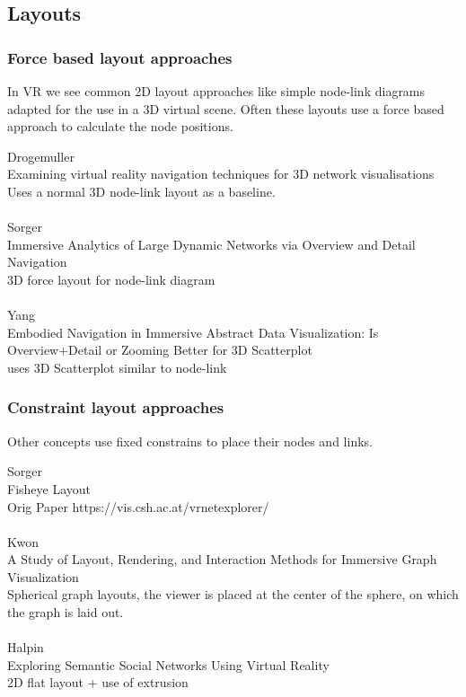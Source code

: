 \subsection{Layouts}

\subsubsection{Force based layout approaches}
In VR we see common 2D layout approaches like simple node-link diagrams adapted for the use in a 3D virtual scene. Often these layouts use a force based approach to calculate the node positions. 

Drogemuller\\
Examining virtual reality navigation techniques for 3D network visualisations\\
Uses a normal 3D node-link layout as a baseline.\\
\\
Sorger\\
Immersive Analytics of Large Dynamic Networks via Overview and Detail Navigation\\
3D force layout for node-link diagram\\
\\
Yang\\
Embodied Navigation in Immersive Abstract Data Visualization:
Is Overview+Detail or Zooming Better for 3D Scatterplot\\
uses 3D Scatterplot similar to node-link
\subsubsection{Constraint layout approaches}
Other concepts use fixed constrains to place their nodes and links.

Sorger\\
Fisheye Layout\\
Orig Paper https://vis.csh.ac.at/vrnetexplorer/\\
\\
Kwon\\
A Study of Layout, Rendering, and Interaction Methods for Immersive Graph Visualization\\
Spherical graph layouts, the viewer is placed at the center of the sphere, on which the graph is laid out.\\
\\
Halpin\\
Exploring Semantic Social Networks Using Virtual Reality\\
2D flat layout + use of extrusion
\\
\\
\\
